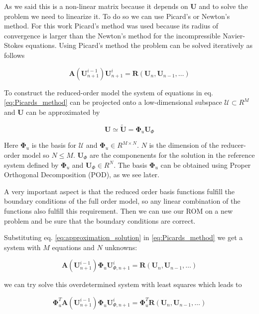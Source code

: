 \documentclass[twoside,11pt]{Latex/Classes/PhDthesisPSnPDF_jacob}
\begin{document}
As we said this is a non-linear matrix because it depends on $\mathbf{U}$ and to solve the problem we need to linearize it. To do so we can use Picard's or Newton's method. For this work Picard's method was used because its radius of convergence is larger than the Newton's method for the incompressible Navier-Stokes equations. Using Picard's method the problem can be solved iteratively as follows

\begin{equation}
\mathbf{A}(\mathbf{U}_{n+1}^{i-1}) \mathbf{U}^i_{n+1} = \mathbf{R}(\mathbf{U}_{n},\mathbf{U}_{n-1},\ldots)
\label{eq:Picards_method}
\end{equation}

To construct the reduced-order model the system of equations in eq. \ref{eq:Picards_method} can be projected onto a low-dimensional subspace $\mathcal{U} \subset R^M$ and $\mathbf{U}$ can be approximated by

\begin{equation}
\mathbf{U} \simeq \tilde{\mathbf{U}} = \mathbf{\Phi}_u \mathbf{U}_\Phi
\label{eq:approximation_solution}
\end{equation}

Here $\mathbf{\Phi}_u$ is the basis for $\mathcal{U}$ and $\mathbf{\Phi}_u \in R^{M\times N}$. $N$ is the dimension of the reducer-order model so $N \leq M$. $\mathbf{U}_\Phi$ are the componenents for the solution in the reference system defined by $\mathbf{\Phi}_u$ and $\mathbf{U}_\Phi \in R^N$. The basis $\mathbf{\Phi}_u$ can be obtained using Proper Orthogonal Decomposition (POD), as we see later.

A very important aspect is that the reduced order basis functions fulfill the boundary conditions of the full order model, so any linear combination of the functions also fulfill this requirement. Then we can use our ROM on a new problem and be sure that the boundary conditions are correct.

Substituting eq. \ref{eq:approximation_solution} in \ref{eq:Picards_method} we get a system with $M$ equations and $N$ unknowns:

\begin{equation}
\mathbf{A}(\mathbf{U}_{n+1}^{i-1})\mathbf{\Phi}_u\mathbf{U}_{\Phi,n+1}^{i} = \mathbf{R}(\mathbf{U}_{n},\mathbf{U}_{n-1},\ldots)
\end{equation}

we can try solve this overdetermined system with least squares which leads to

\begin{equation}
\mathbf{\Phi}_u^T \mathbf{A}(\mathbf{U}_{n+1}^{i-1})\mathbf{\Phi}_u\mathbf{U}_{\Phi,n+1}^{i} = \mathbf{\Phi}_u^T \mathbf{R}(\mathbf{U}_{n},\mathbf{U}_{n-1},\ldots)
\end{equation}
\end{document}
